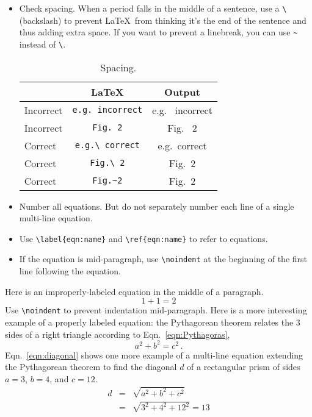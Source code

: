 \documentclass[aps,prb,twocolumn,superscriptaddress,floatfix,longbibliography]{revtex4-2}
\begin{document}
\begin{itemize}[label=$\Box$]
\item Check spacing. When a period falls in the middle of a sentence, use a {\tt \textbackslash} (backslash) to prevent \LaTeX\ from thinking it's the end of the sentence and thus adding extra space. If you want to prevent a linebreak, you can use {\tt \textasciitilde} instead of {\tt \textbackslash}.
\begin{table}[h!]
  \begin{center}
    \caption{Spacing.}
    \label{tab:spacing}
    \begin{tabular}{l|c|c} %
      \hline
       & \LaTeX & Output \\
      \hline \hline
      Incorrect & {\tt e.g.\ incorrect} & e.g. \ incorrect \\
      Incorrect & {\tt Fig.\ 2} & Fig. \ 2 \\
      Correct & {\tt e.g.\textbackslash\ correct} & e.g.\ correct \\
      Correct & {\tt Fig.\textbackslash\ 2} & Fig.\ 2 \\
      Correct & {\tt Fig.\textasciitilde 2} & Fig.~2 \\
      \hline
    \end{tabular}
  \end{center}
\end{table}

\item Number all equations. But do not separately number each line of a single multi-line equation.
\item Use {\tt \textbackslash label\{eqn:name\}} and {\tt \textbackslash ref\{eqn:name\}} to refer to equations.
\item If the equation is mid-paragraph, use {\tt \textbackslash noindent} at the beginning of the first line following the equation.
\end{itemize}

\newpage Here is an improperly-labeled equation in the middle of a paragraph.
\[
1+1=2
\]
\noindent Use {\tt \textbackslash noindent} to prevent indentation mid-paragraph. Here is a more interesting example of a properly labeled equation: the Pythagorean theorem relates the 3 sides of a right triangle according to Eqn.\ \ref{eqn:Pythagoras},
\begin{equation}
a^2+b^2=c^2 \,.
\label{eqn:Pythagoras}
\end{equation}
\noindent Eqn.\ \ref{eqn:diagonal} shows one more example of a multi-line equation extending the Pythagorean theorem to find the diagonal $d$ of a rectangular prism of sides $a=3$, $b=4$, and $c=12$.
\begin{eqnarray}
\label{eqn:diagonal}
\nonumber d & = & \sqrt{a^2 + b^2 + c^2} \\
& = & \sqrt{3^2+4^2+12^2} = 13
\end{eqnarray}
\end{document}
